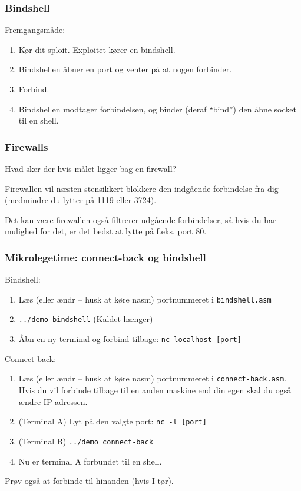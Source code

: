 \documentclass[slidestop,compress,mathserif, xcolor=table]{beamer}
\begin{document}
\begin{frame}[c]
  \frametitle{Bindshell}
  Fremgangsmåde:
  \begin{enumerate}
  \item<+-> Kør dit sploit. Exploitet kører en bindshell.
  \item<+-> Bindshellen åbner en port og venter på at nogen forbinder.
  \item<+-> Forbind.
    
  \item<+-> Bindshellen modtager forbindelsen, og binder (deraf ``bind'') den
    åbne socket til en shell.
  \end{enumerate}
\end{frame}

\begin{frame}[c]
  \frametitle{Firewalls}
  Hvad sker der hvis målet ligger bag en firewall? \vskip25pt
  \begin{description}
  \item<+->[Bindshell] Firewallen vil næsten stensikkert blokkere den indgående
    forbindelse fra dig (medmindre du lytter på 1119 eller 3724).
  \item<+->[Connect-back] Det kan være firewallen også filtrerer udgående
    forbindelser, så hvis du har mulighed for det, er det bedst at lytte på
    f.eks. port 80.
  \end{description}
\end{frame}

\begin{frame}
  \frametitle{Mikrolegetime: connect-back og bindshell}

  \pause
  Bindshell:
  {\scriptsize
    \begin{enumerate}
  \pause
    \item Læs (eller ændr -- husk at køre nasm) portnummeret i
      \texttt{bindshell.asm}
  \pause
    \item \texttt{../demo bindshell} (Kaldet hænger)
  \pause
    \item Åbn en ny terminal og forbind tilbage:
      \texttt{nc localhost [port]}
    \end{enumerate}
  }


  \pause
  Connect-back:
  {\scriptsize
    \begin{enumerate}
  \pause
    \item Læs (eller ændr -- husk at køre nasm) portnummeret i
      \texttt{connect-back.asm}. Hvis du vil forbinde tilbage til en anden
      maskine end din egen skal du også ændre IP-adressen.
  \pause
    \item (Terminal A) Lyt på den valgte port: \texttt{nc -l [port]}
  \pause
    \item (Terminal B) \texttt{../demo connect-back}
  \pause
    \item Nu er terminal A forbundet til en shell.
    \end{enumerate}
  }

  \pause
  \vskip15pt
  Prøv også at forbinde til hinanden (hvis I tør).
\end{frame}
\end{document}
